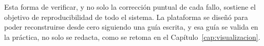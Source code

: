 Esta forma de verificar, y no solo la corrección puntual de cada fallo,
sostiene el objetivo de reproducibilidad de todo el sistema. La
plataforma se diseñó para poder reconstruirse desde cero siguiendo una
guía escrita, y esa guía se valida en la práctica, no solo se redacta,
como se retoma en el Capítulo~\ref{cap:visualizacion}.
